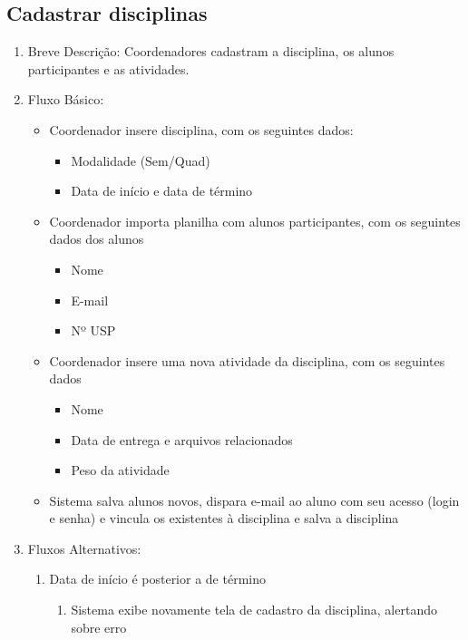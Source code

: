 \subsection{Cadastrar disciplinas}
\begin{enumerate}
    \item Breve Descrição: Coordenadores cadastram a disciplina, os alunos participantes e as atividades.
    \item Fluxo Básico:
        \begin{itemize}
            \item Coordenador insere disciplina, com os seguintes dados:
            \begin{itemize}
                \item Modalidade (Sem/Quad)
                \item Data de início e data de término
            \end{itemize}
            \item Coordenador importa planilha com alunos participantes, com os seguintes dados dos alunos
            \begin{itemize}
                \item Nome
                \item E-mail
                \item Nº USP
            \end{itemize}
            \item Coordenador insere uma nova atividade da disciplina, com os seguintes dados
            \begin{itemize}
                \item Nome
                \item Data de entrega e arquivos relacionados
                \item Peso da atividade
            \end{itemize}
            \item Sistema salva alunos novos, dispara e-mail ao aluno com seu acesso (login e senha) e vincula os existentes à disciplina e salva a disciplina
        \end{itemize}
    \item Fluxos Alternativos:
    \begin{enumerate}
        \item Data de início é posterior a de término
        \begin{enumerate}
            \item Sistema exibe novamente tela de cadastro da disciplina, alertando sobre erro

\end{enumerate}
\end{enumerate}
\end{enumerate}
